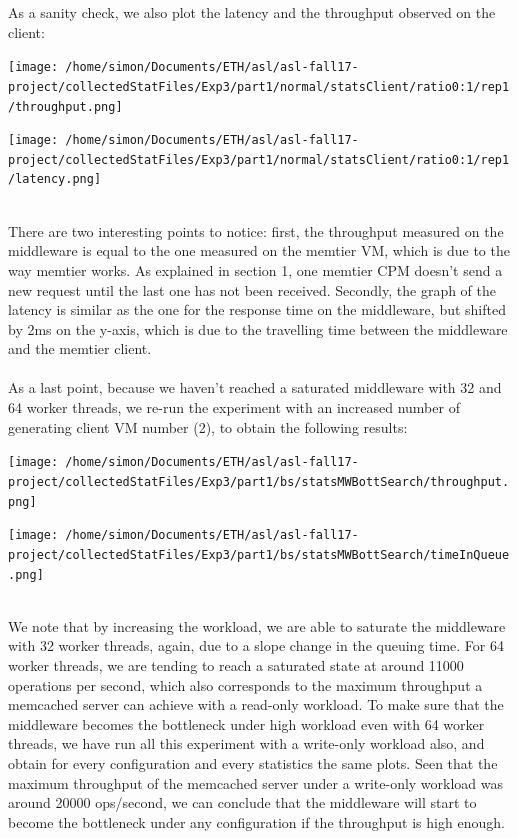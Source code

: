 \documentclass[11pt,a4paper]{article}
\begin{document}
As a sanity check, we also plot the latency and the throughput observed on the client:
\\
\begin{minipage}{0.5\linewidth}
\texttt{[image: /home/simon/Documents/ETH/asl/asl-fall17-project/collectedStatFiles/Exp3/part1/normal/statsClient/ratio0:1/rep1/throughput.png]}
\end{minipage}
\hfill
\begin{minipage}{0.5\linewidth}
\texttt{[image: /home/simon/Documents/ETH/asl/asl-fall17-project/collectedStatFiles/Exp3/part1/normal/statsClient/ratio0:1/rep1/latency.png]}
\end{minipage}
\\
There are two interesting points to notice: first, the throughput measured on the middleware is equal to the one measured on the memtier VM, which is due to the way memtier works. As explained in section 1, one memtier CPM doesn't send a new request until the last one has not been received. Secondly, the graph of the latency is similar as the one for the response time on the middleware, but shifted by 2ms on the y-axis, which is due to the travelling time between the middleware and the memtier client. 
\\
\\
As a last point, because we haven't reached a saturated middleware with 32 and 64 worker threads, we re-run the experiment with an increased number of generating client VM number (2), to obtain the following results:
\\
\begin{minipage}{0.5\linewidth}
\texttt{[image: /home/simon/Documents/ETH/asl/asl-fall17-project/collectedStatFiles/Exp3/part1/bs/statsMWBottSearch/throughput.png]}
\end{minipage}
\hfill
\begin{minipage}{0.5\linewidth}
\texttt{[image: /home/simon/Documents/ETH/asl/asl-fall17-project/collectedStatFiles/Exp3/part1/bs/statsMWBottSearch/timeInQueue.png]}
\end{minipage}
\\
We note that by increasing the workload, we are able to saturate the middleware with 32 worker threads, again, due to a slope change in the queuing time. For 64 worker threads, we are tending to reach a saturated state at around 11000 operations per second, which also corresponds to the maximum throughput a memcached server can achieve with a read-only workload. To make sure that the middleware becomes the bottleneck under high workload even with 64 worker threads, we have run all this experiment with a write-only workload also, and obtain for every configuration and every statistics the same plots. Seen that the maximum throughput of the memcached server under a write-only workload was around 20000 ops/second, we can conclude that the middleware will start to become the bottleneck under any configuration if the throughput is high enough. 
   
\end{document}
